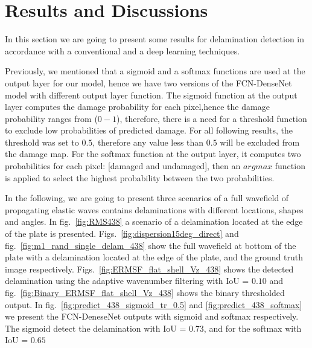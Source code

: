 \section{Results and Discussions}
	In this section we are going to present some results for delamination detection in accordance with a conventional and a deep learning techniques. 
	
	Previously, we mentioned that a sigmoid and a softmax functions are used at the output layer for our model, hence we have two versions of the FCN-DenseNet model with different output layer function.
	The sigmoid function at the output layer computes the damage probability for each pixel,hence the damage probability ranges from (\(0 - 1\)), therefore, there is a need for a threshold function to exclude low probabilities of predicted damage. 
	For all following results, the threshold was set to \(0.5\), therefore any value less than \(0.5\) will be excluded from the damage map.
	For the softmax function at the output layer, it computes two probabilities for each pixel: [damaged and undamaged], then an \(argmax\) function is applied to select the highest probability between the two probabilities. 

	In the following, we are going to present three scenarios of a full wavefield of propagating elastic waves contains delaminations with different locations, shapes and angles.
	In fig.~\ref{fig:RMS438} a scenario of a delamination located at the edge of the plate is presented.
	Figs.~\ref{fig:dispersion15deg_direct} and fig.~\ref{fig:m1_rand_single_delam_438} show the full wavefield at bottom  of the plate with a delamination located at the edge of the plate, and the ground truth image respectively.
	Figs.~\ref{fig:ERMSF_flat_shell_Vz_438} shows the detected delamination using the adaptive wavenumber filtering with IoU = \(0.10\) and fig.~\ref{fig:Binary_ERMSF_flat_shell_Vz_438} shows the binary thresholded output.
	In fig.~\ref{fig:predict_438_sigmoid_tr_0.5} and \ref{fig:predict_438_softmax} we present the FCN-DeneseNet outputs with sigmoid and softmax respectively.
	The sigmoid detect the delamination with IoU = \(0.73\), and for the softmax with IoU = \(0.65\)

